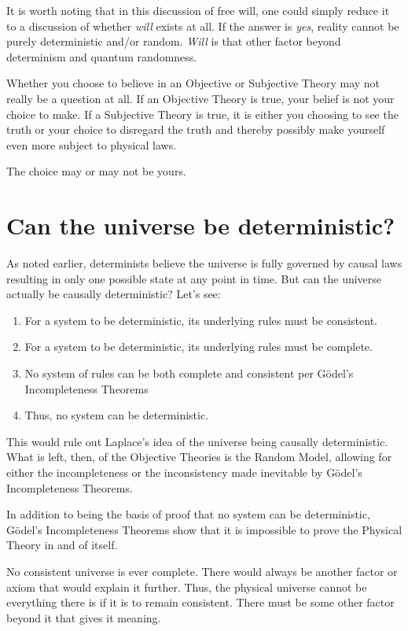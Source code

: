 \documentclass[11pt]{article}
\begin{document}
It is worth noting that in this discussion of free will, one could simply reduce
it to a discussion of whether {\em will} exists at all. If the answer is {\em
yes}, reality cannot be purely deterministic and/or random. {\em Will} is that
other factor beyond determinism and quantum randomness.

Whether you choose to believe in an Objective or Subjective Theory may not
really be a question at all. If an Objective Theory is true, your belief is not
your choice to make. If a Subjective Theory is true, it is either you choosing
to see the truth or your choice to disregard the truth and thereby possibly
make yourself even more subject to physical laws.

The choice may or may not be yours.

\newpage

\section{Can the universe be deterministic?}

As noted earlier, determinists believe the universe is fully governed by causal
laws resulting in only one possible state at any point in time. But can the
universe actually be causally deterministic? Let's see:

\begin{enumerate}
	\item For a system to be deterministic, its underlying rules must be consistent.
	\item For a system to be deterministic, its underlying rules must be complete.
	\item No system of rules can be both complete and consistent per G\"{o}del's Incompleteness Theorems	
   \item Thus, no system can be deterministic.
\end{enumerate}

This would rule out Laplace's idea of the universe being causally deterministic.
What is left, then, of the Objective Theories is the Random Model, allowing for
either the incompleteness or the inconsistency made inevitable by G\"{o}del's
Incompleteness Theorems.

In addition to being the basis of proof that no system can be deterministic,
G\"{o}del's Incompleteness Theorems show that it is impossible to prove the
Physical Theory in and of itself.

No consistent universe is ever complete. There would always be another factor or
axiom that would explain it further. Thus, the physical universe cannot be
everything there is if it is to remain consistent. There must be some other
factor beyond it that gives it meaning.
\end{document}
